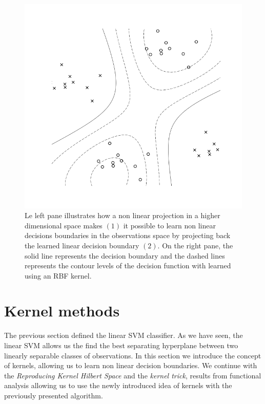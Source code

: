 \begin{figure}
  \begin{minipage}{.5\textwidth}
    \centering
    
  \end{minipage}%
  \begin{minipage}{.5\textwidth}
    \centering
    \includegraphics[width=\linewidth]{decision_boundary.png}
  \end{minipage}
  \caption{
    Le left pane illustrates how a non linear projection in a higher dimensional space makes $(1)$ it possible to learn non linear decisions boundaries in the observations space by projecting back the learned linear decision boundary $(2)$. On the right pane, the solid line represents the decision boundary and the dashed lines represents the contour levels of the decision function with learned using an RBF kernel.
  }
\end{figure}

\section{Kernel methods}

The previous section defined the linear SVM classifier. As we have seen, the linear SVM  allows us the find the best separating hyperplane between two linearly separable classes of observations. In this section we introduce the concept of kernels, allowing us to learn non linear decision boundaries. We continue with the \textit{Reproducing Kernel Hilbert Space} and the \textit{kernel trick}, results from functional analysis allowing us to use the newly introduced idea of kernels with the previously presented algorithm.


